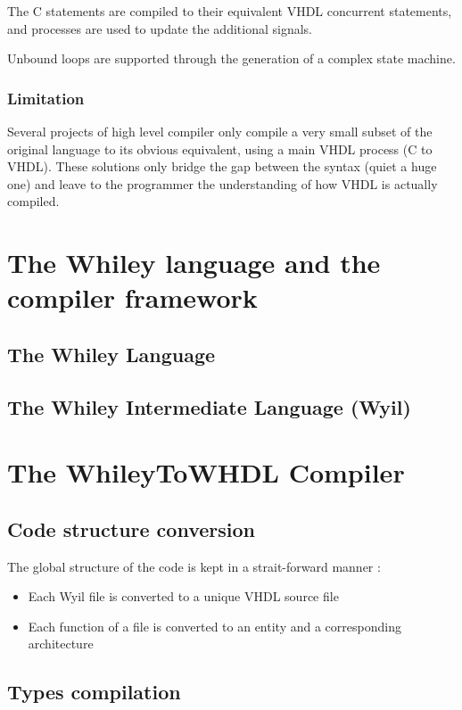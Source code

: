 \documentclass[10pt,a4paper]{article}
\renewcommand{\indent}{~\\\vspace{-.8cm}}
\begin{document}
The C statements are compiled to their equivalent VHDL concurrent statements, and processes are used to update the additional signals.

Unbound loops are supported through the generation of a complex state machine.

\subsubsection{Limitation}

Several projects of high level compiler only compile a very small subset of the original language to its obvious equivalent, using a main VHDL process (C to VHDL).
These solutions only bridge the gap between the syntax (quiet a huge one) and leave to the programmer the understanding of how VHDL is actually compiled.


\section{The Whiley language and the compiler framework}

\subsection{The Whiley Language}

\subsection{The Whiley Intermediate Language (Wyil)}


\section{The WhileyToWHDL Compiler}

\subsection{Code structure conversion}

The global structure of the code is kept in a strait-forward manner :
\begin{itemize}
	\item Each Wyil file is converted to a unique VHDL source file
	\item Each function of a file is converted to an entity and a corresponding architecture
\end{itemize}


\subsection{Types compilation}
\indent 
\end{document}
